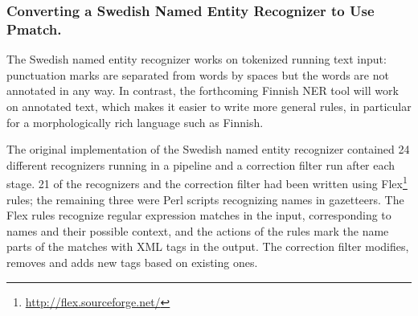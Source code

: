\documentclass{llncs}
\begin{document}

\subsubsection{Converting a Swedish Named Entity Recognizer to Use
  Pmatch.}

The Swedish named entity recognizer works on tokenized running text
input: punctuation marks are separated from words by spaces but the
words are not annotated in any way. In contrast, the forthcoming
Finnish NER tool will work on annotated text, which makes it easier to
write more general rules, in particular for a morphologically rich
language such as Finnish.

The original implementation of the Swedish named entity recognizer
\cite{kokkinakis/2003} contained 24 different recognizers running in a
pipeline and a correction filter run after each stage. 21 of the
recognizers and the correction filter had been written using
Flex\footnote{\url{http://flex.sourceforge.net/}} rules; the remaining three
were Perl scripts recognizing names in gazetteers. The Flex rules
recognize regular expression matches in the input, corresponding to names
and their possible context, and the actions of the rules mark the name
parts of the matches with XML tags in the output. The correction
filter modifies, removes and adds new tags based on existing ones.

\end{document}
